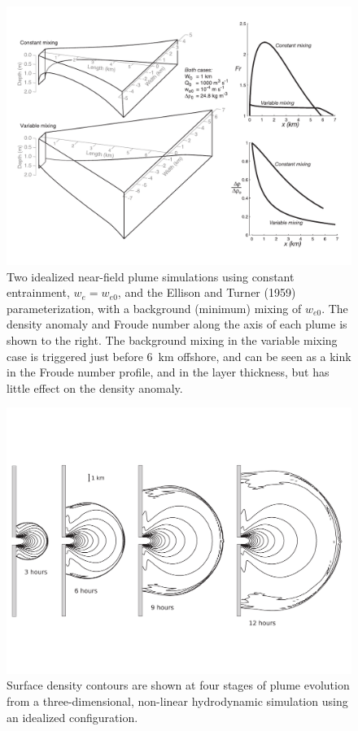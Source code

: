 \documentclass[12pt]{article}
\begin{document}
\begin{figure}[p]
    \centering
    \includegraphics[width=6.5in]{Figures/plume3d_Fr_dr.pdf}
    \caption{Two idealized near-field plume simulations using constant entrainment, $w_e=w_{e0}$, and the Ellison and Turner (1959) parameterization, with a background (minimum) mixing of $w_{e0}$. The density anomaly and Froude number along the axis of each plume is shown to the right. The background mixing in the variable mixing case is triggered just before 6~km offshore, and can be seen as a kink in the Froude number profile, and in the layer thickness, but has little effect on the density anomaly. }
    \label{fig:plume3d_Fr_dr}
\end{figure}

\begin{figure}[p]
    \centering
    \includegraphics[width=6in]{Figures/plume_expansion_frames.pdf}
    \caption{Surface density contours are shown at four stages of plume evolution from a three-dimensional, non-linear hydrodynamic simulation using an idealized configuration.}
    \label{fig:3d_expansion}
\end{figure}
\end{document}
